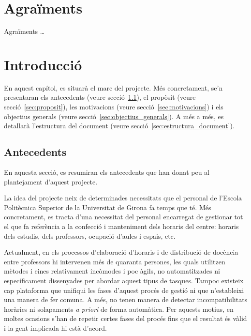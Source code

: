 \documentclass[a4paper,12pt]{ThesisStyle}
\begin{document}
\let\cleardoublepage\clearpage
{}
\frontmatter
\dominitoc

\chapter*{Agraïments}
\label{cap:agraiments}

Agraïments \ldots


\tableofcontents
\listoffigures
\listoftables

\mainmatter

\chapter{Introducció}
\label{cap:intro}

En aquest capítol, es situarà el marc del projecte. Més concretament, se'n presentaran els antecedents (veure secció~\ref{sec:antecedents}), el propòsit (veure secció~\ref{sec:proposit}), les motivacions (veure secció~\ref{sec:motivacions}) i els objectius generals (veure secció~\ref{sec:objectius_generals}). A més a més, es detallarà l'estructura del document (veure secció~\ref{sec:estructura_document}).

\section{Antecedents}
\label{sec:antecedents}

En aquesta secció, es resumiran els antecedents que han donat peu al plantejament d'aquest projecte.

La idea del projecte neix de determinades necessitats que el personal de l'Escola Politècnica Superior de la Universitat de Girona fa temps que té. Més concretament, es tracta d'una necessitat del personal encarregat de gestionar tot el que fa referència a la confecció i manteniment dels horaris del centre: horaris dels estudis, dels professors, ocupació d'aules i espais, etc.

Actualment, en els processos d'elaboració d'horaris i de distribució de docència entre professors hi intervenen més de quaranta persones, les quals utilitzen mètodes i eines relativament incòmodes i poc àgils, no automatitzades ni específicament dissenyades per abordar aquest tipus de tasques. Tampoc existeix cap plataforma que unifiqui les fases d'aquest procés de gestió ni que n'estableixi una manera de fer comuna. A més, no tenen manera de detectar incompatibilitats horàries ni solapaments \textit{a priori} de forma automàtica. Per aquests motius, en moltes ocasions s'han de repetir certes fases del procés fins que el resultat és vàlid i la gent implicada hi està d'acord.
\end{document}

